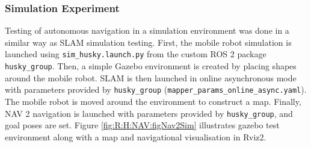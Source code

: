 \FloatBarrier
\subsubsection{Simulation Experiment}
Testing of autonomous navigation in a simulation environment was done in a similar way as SLAM simulation testing. First, the mobile robot simulation is launched using \lstinline{sim_husky.launch.py} from the custom ROS 2 package \lstinline{husky_group}. Then, a simple Gazebo environment is created by placing shapes around the mobile robot. SLAM is then launched in online asynchronous mode with parameters provided by \lstinline{husky_group} (\lstinline{mapper_params_online_async.yaml}). The mobile robot is moved around the environment to construct a map. Finally, NAV 2 navigation is launched with parameters provided by \lstinline{husky_group}, and goal poses are set. Figure \ref{fig:R:H:NAV:figNav2Sim} illustrates gazebo test environment along with a map and navigational visualisation in Rviz2.

